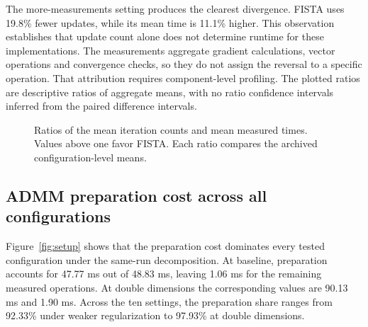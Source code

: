 \documentclass{article}
\begin{document}
The more-measurements setting produces the clearest divergence. FISTA uses 19.8\% fewer updates, while its mean time is 11.1\% higher. This observation establishes that update count alone does not determine runtime for these implementations. The measurements aggregate gradient calculations, vector operations and convergence checks, so they do not assign the reversal to a specific operation. That attribution requires component-level profiling. The plotted ratios are descriptive ratios of aggregate means, with no ratio confidence intervals inferred from the paired difference intervals.

\begin{figure}[htbp]\centering
{}
\caption{Ratios of the mean iteration counts and mean measured times. Values above one favor FISTA. Each ratio compares the archived configuration-level means.}\label{fig:ratios}
\end{figure}

\subsection{ADMM preparation cost across all configurations}
Figure~\ref{fig:setup} shows that the preparation cost dominates every tested configuration under the same-run decomposition. At baseline, preparation accounts for 47.77 ms out of 48.83 ms, leaving 1.06 ms for the remaining measured operations. At double dimensions the corresponding values are 90.13 ms and 1.90 ms. Across the ten settings, the preparation share ranges from 92.33\% under weaker regularization to 97.93\% at double dimensions.
\end{document}
